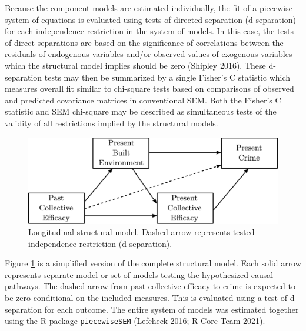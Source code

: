 \documentclass [11pt, proquest] {uwthesis}[2015/03/03]
\begin{document}
Because the component models are estimated individually, the fit of a piecewise system of equations is evaluated using tests of directed separation (d-separation) for each independence restriction in the system of models. In this case, the tests of direct separations are based on the significance of correlations between the residuals of endogenous variables and/or observed values of exogenous variables which the structural model implies should be zero (Shipley 2016). These d-separation tests may then be summarized by a single Fisher's C statistic which measures overall fit similar to chi-square tests based on comparisons of observed and predicted covariance matrices in conventional SEM. Both the Fisher's C statistic and SEM chi-square may be described as simultaneous tests of the validity of all restrictions implied by the structural models.
\begin{figure}
\includegraphics[width=1\linewidth]{./figure/ch2/longitudinal_models} \caption{Longitudinal  structural model. Dashed arrow represents tested independence restriction (d-separation).}\label{fig:longmodels}
\end{figure}
Figure \ref{fig:longmodels} is a simplified version of the complete structural model. Each solid arrow represents separate model or set of models testing the hypothesized causal pathways. The dashed arrow from past collective efficacy to crime is expected to be zero conditional on the included measures. This is evaluated using a test of d-separation for each outcome. The entire system of models was estimated together using the R package \texttt{piecewiseSEM} (Lefcheck 2016; R Core Team 2021).
\end{document}
